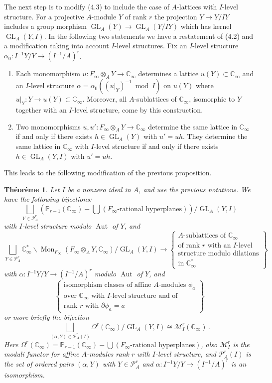 \documentclass[12pt,a4paper]{article}
\theoremstyle{plain}
\newtheorem{theorem}{Th\'eor\`eme}[section]
\theoremstyle{definition}
\theoremstyle{remark}
\DeclareMathOperator{\Aut}{Aut}
\DeclareMathOperator{\Mon}{Mon}
\DeclareMathOperator{\GL}{GL}
\begin{document}
The next step is to modify (4.3) to include the case of $A$-lattices with 
$I$-level structure. For a projective $A$-module $Y$ of rank $r$ the 
projection $Y \to Y/IY$ includes a group morphism 
$\GL_A(Y) \to \GL_A(Y/IY)$ which has kernel $\GL_A(Y,I)$. In the following 
two statements we have a restatement of (4.2) and a modification taking into 
account $I$-level structures. Fix an $I$-level structure 
$\alpha_0\colon I^{-1}Y/Y \to (I^{-1}/A)^r$.
\begin{enumerate}[label=(\arabic*)]
\item Each monomorphism $u\colon F_\infty \otimes_A Y \to \mathbb{C}_\infty$ 
determines a lattice $u(Y) \subset \mathbb{C}_\infty$ and an $I$-level structure 
$\alpha = \alpha_0((u|_Y)^{-1} \bmod I)$ on $u(Y)$ where 
$u|_Y\colon Y \to u(Y) \subset \mathbb{C}_\infty$. Moreover, all $A$-sublattices 
of $\mathbb{C}_\infty$, isomorphic to $Y$ together with an $I$-level structure, 
come by this construction.
\item Two monomorphisms $u, u'\colon F_\infty \otimes_A Y \to \mathbb{C}_\infty$ 
determine the same lattice in $\mathbb{C}_\infty$ if and only if there exists 
$h \in \GL_A(Y)$ with $u' = uh$. They determine the same lattice in 
$\mathbb{C}_\infty$ with $I$-level structure if and only if there exists 
$h \in \GL_A(Y,I)$ with $u' = uh$.
\end{enumerate}

This leads to the following modification of the previous proposition.

\begin{theorem}
Let $I$ be a nonzero ideal in $A$, and use the previous notations. We have 
the following bijections:
\[
\bigsqcup_{Y \in \mathcal{P}_A^r} (\mathbb{P}_{r-1}(\mathbb{C}_\infty) - \bigcup(\text{$F_\infty$-rational hyperplanes}))/\GL_A(Y,I)
\]
with $I$-level structure modulo $\Aut$ of $Y$, and
\[
\bigsqcup_{Y \in \mathcal{P}_A^r} \mathbb{C}_\infty^* \backslash \Mon_{F_\infty}(F_\infty \otimes_A Y, \mathbb{C}_\infty)/\GL_A(Y,I) \longrightarrow \left\{\substack{\text{$A$-sublattices of $\mathbb{C}_\infty$}\\\text{of rank $r$ with an $I$-level}\\\text{structure modulo dilations}\\\text{in $\mathbb{C}_\infty^*$}}\right\}
\]
with $\alpha\colon I^{-1}Y/Y \to (I^{-1}/A)^r$ modulo $\Aut$ of $Y$, and
\[
\left\{\substack{\text{isomorphism classes of affine $A$-modules $\phi_a$}\\\text{over $\mathbb{C}_\infty$ with $I$-level structure and of}\\\text{rank $r$ with $\partial\phi_a = a$}}\right\}
\]
or more briefly the bijection
\[
\bigsqcup_{(\alpha,Y) \in \mathcal{P}_A^r(I)} \Omega^r(\mathbb{C}_\infty)/\GL_A(Y,I) \cong \mathcal{M}_I^r(\mathbb{C}_\infty) \,.
\]
Here $\Omega^r(\mathbb{C}_\infty) = \mathbb{P}_{r-1}(\mathbb{C}_\infty) - \bigcup(\text{$F_\infty$-rational hyperplanes})$, 
also $\mathcal{M}_I^r$ is the moduli functor for affine $A$-modules rank $r$ 
with $I$-level structure, and $\mathcal{P}_A^r(I)$ is the set of ordered pairs 
$(\alpha,Y)$ with $Y \in \mathcal{P}_A^r$ and $\alpha\colon I^{-1}Y/Y \to (I^{-1}/A)^r$ 
is an isomorphism.
\end{theorem}
\end{document}
